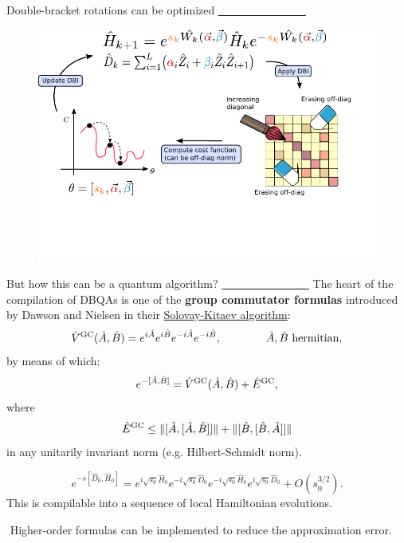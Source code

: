 \documentclass[aspectratio=169, 8pt, xcolor={svgnames}]{beamer}
\begin{document}
\begin{frame}{Double-bracket rotations can be optimized \hfill \href{https://arxiv.org/abs/2408.07431}{\textcolor{white}{\faBook\,\,arXiv:2408.07431}}}
\begin{center}
\begin{figure}
   \includegraphics[width=1\textwidth]{figures/dbi_scheme_ink.pdf}
\end{figure}
\end{center}
\end{frame}

\begin{frame}{But how this can be a quantum algorithm? \hfill \href{https://arxiv.org/abs/2206.11772}{\textcolor{white}{\faBook\,\,arXiv:2206.11772}}}
The heart of the compilation of DBQAs is one of the \textbf{group commutator formulas} introduced
by Dawson and Nielsen in their \href{https://arxiv.org/abs/quant-ph/0505030}{Solovay-Kitaev algorithm}:
$$ \hat{V}^{\rm GC}(\hat{A}, \hat{B}) = e^{i\hat{A}} e^{i\hat{B}} e^{-i\hat{A}} e^{-i\hat{B}}, \qquad \qquad \hat{A}, \hat{B} \,\,\text{hermitian},$$
by means of which:
$$ e^{-[\hat{A}, \hat{B}]} = \hat{V}^{\rm GC}(\hat{A}, \hat{B}) + \hat{E}^{\rm GC}, $$
where 
$$  \hat{E}^{\rm GC} \leq \| [ \hat{A}, [\hat{A}, \hat{B}]] \| + \| [ \hat{B}, [\hat{B}, \hat{A}]] \|$$
in any unitarily invariant norm (e.g. Hilbert-Schmidt norm).

\begin{tcolorbox}[colback=red!15, title=How about DBI?]
$$ e^{- s [\hat{D}_0, \hat{H}_0]} = e^{i \sqrt{s_0}\hat{H}_0} 
e^{-i \sqrt{s_0}\hat{D}_0} e^{-i \sqrt{s_0}\hat{H}_0} e^{i \sqrt{s_0}\hat{D}_0} + O(s_0^{3/2}).$$
This is compilable into a sequence of local Hamiltonian evolutions.
\end{tcolorbox}
\faExclamationCircle\,\,Higher-order formulas can be implemented to reduce the approximation error.
\end{frame}
\end{document}
